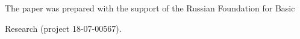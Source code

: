   


  



  




\vspace*{-24pt}



\Ack



\vspace*{-3pt}



\noindent

The paper was prepared with the support of the Russian Foundation for Basic 

Research (project 18-07-00567).






